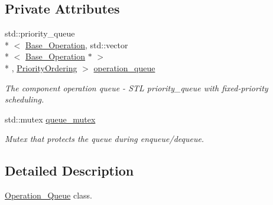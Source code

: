 \subsection*{Private Attributes}
\begin{DoxyCompactItemize}
\item 
std\-::priority\-\_\-queue\\*
$<$ \hyperlink{classzcm_1_1Base__Operation}{Base\-\_\-\-Operation}, std\-::vector\\*
$<$ \hyperlink{classzcm_1_1Base__Operation}{Base\-\_\-\-Operation} $\ast$ $>$\\*
, \hyperlink{structzcm_1_1Operation__Queue_1_1PriorityOrdering}{Priority\-Ordering} $>$ \hyperlink{classzcm_1_1Operation__Queue_a5f846fe69a28fd93c1182bff69b20379}{operation\-\_\-queue}
\begin{DoxyCompactList}\small\item\em The component operation queue -\/ S\-T\-L priority\-\_\-queue with fixed-\/priority scheduling. \end{DoxyCompactList}\item 
std\-::mutex \hyperlink{classzcm_1_1Operation__Queue_a2203c4541451d68bbf3f5dfc7efe8449}{queue\-\_\-mutex}
\begin{DoxyCompactList}\small\item\em Mutex that protects the queue during enqueue/dequeue. \end{DoxyCompactList}\end{DoxyCompactItemize}


\subsection{Detailed Description}
\hyperlink{classzcm_1_1Operation__Queue}{Operation\-\_\-\-Queue} class. 

